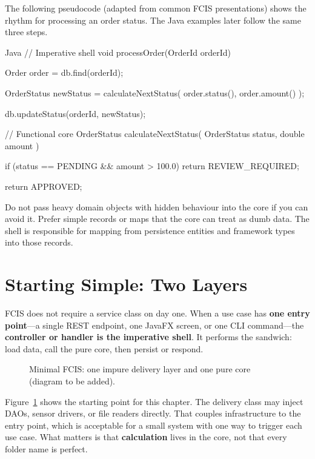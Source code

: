 The following pseudocode (adapted from common FCIS presentations) shows the rhythm for processing an order status. The Java examples later follow the same three steps.

\begin{ridercode}{Java}
// Imperative shell
void processOrder(OrderId orderId)
{
    Order order = db.find(orderId);

    OrderStatus newStatus = calculateNextStatus(
        order.status(),
        order.amount()
    );

    db.updateStatus(orderId, newStatus);
}

// Functional core
OrderStatus calculateNextStatus(
    OrderStatus status,
    double amount
)
{
    if (status == PENDING && amount > 100.0)
    {
        return REVIEW_REQUIRED;
    }

    return APPROVED;
}
\end{ridercode}
\label{lst:fcis-sandwich-pseudocode}

Do not pass heavy domain objects with hidden behaviour into the core if you can avoid it. Prefer simple records or maps that the core can treat as dumb data.\autocite{fritzscheFcis} The shell is responsible for mapping from persistence entities and framework types into those records.

\section{Starting Simple: Two Layers}
\label{sec:fcis_two_layers}

FCIS does not require a service class on day one. When a use case has \textbf{one entry point}---a single REST endpoint, one JavaFX screen, or one CLI command---the \textbf{controller or handler is the imperative shell}. It performs the sandwich: load data, call the pure core, then persist or respond.

\begin{figure}[htbp]
\centering
{}
\caption{Minimal FCIS: one impure delivery layer and one pure core (diagram to be added).}
\label{fig:fcis_two_layers}
\end{figure}

Figure~\ref{fig:fcis_two_layers} shows the starting point for this chapter. The delivery class may inject DAOs, sensor drivers, or file readers directly. That couples infrastructure to the entry point, which is acceptable for a small system with one way to trigger each use case. What matters is that \textbf{calculation} lives in the core, not that every folder name is perfect.

